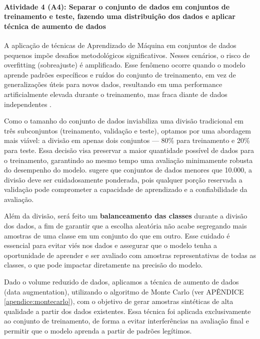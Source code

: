 \paragraph{\textbf{Atividade 4 (A4):} Separar o conjunto de dados em conjuntos de treinamento e teste, fazendo uma distribuição dos dados e aplicar técnica de aumento de dados}

A aplicação de técnicas de Aprendizado de Máquina em conjuntos de dados pequenos impõe desafios metodológicos significativos. Nesses cenários, o risco de overfitting (sobreajuste) é amplificado. Esse fenômeno ocorre quando o modelo aprende padrões específicos e ruídos do conjunto de treinamento, em vez de generalizações úteis para novos dados, resultando em uma performance artificialmente elevada durante o treinamento, mas fraca diante de dados independentes \cite{bashir2020}.

Como o tamanho do conjunto de dados inviabiliza uma divisão tradicional em três subconjuntos (treinamento, validação e teste), optamos por uma abordagem mais viável: a divisão em apenas dois conjuntos — 80\% para treinamento e 20\% para teste. Essa decisão visa preservar a maior quantidade possível de dados para o treinamento, garantindo ao mesmo tempo uma avaliação minimamente robusta do desempenho do modelo.  sugere que conjuntos de dados menores que 10.000, a divisão deve ser cuidadosamente ponderada, pois qualquer porção reservada a validação pode comprometer a capacidade de aprendizado e a confiabilidade da avaliação.

Além da divisão, será feito um \textbf{balanceamento das classes} durante a divisão dos dados, a fim de garantir que a escolha aleatória não acabe segregando mais amostras de uma classe em um conjunto do que em outro. Esse cuidado é essencial para evitar viés nos dados e assegurar que o modelo tenha a oportunidade de aprender e ser avaliado com amostras representativas de todas as classes, o que pode impactar diretamente na precisão do modelo.

Dado o volume reduzido de dados, aplicamos a técnica de aumento de dados (data augmentation), utilizando o algoritmo de Monte Carlo (ver APÊNDICE \ref{apendice:montecarlo}), com o objetivo de gerar amostras sintéticas de alta qualidade a partir dos dados existentes. Essa técnica foi aplicada exclusivamente ao conjunto de treinamento, de forma a evitar interferências na avaliação final e permitir que o modelo aprenda a partir de padrões legítimos.  


